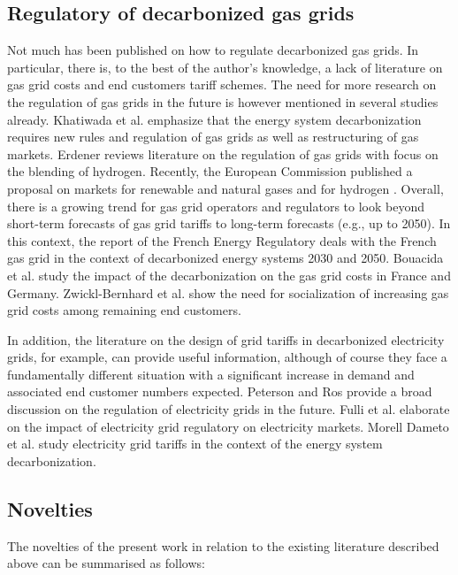 \subsection{Regulatory of decarbonized gas grids}\label{tariffs}
Not much has been published on how to regulate decarbonized gas grids. In particular, there is, to the best of the author's knowledge, a lack of literature on gas grid costs and end customers tariff schemes. The need for more research on the regulation of gas grids in the future is however mentioned in several studies already. Khatiwada et al. \cite{khatiwada2022decarbonization} emphasize that the energy system decarbonization requires new rules and regulation of gas grids as well as restructuring of gas markets. Erdener \cite{erdener2023review} reviews literature on the regulation of gas grids with focus on the blending of hydrogen. Recently, the European Commission published a proposal on markets for renewable and natural gases and for hydrogen \cite{propsal_gas_market}. Overall, there is a growing trend for gas grid operators and regulators to look beyond short-term forecasts of gas grid tariffs to long-term forecasts (e.g., up to 2050). In this context, the report of the French Energy Regulatory \cite{french} deals with the French gas grid in the context of decarbonized energy systems 2030 and 2050. Bouacida et al. \cite{bouacida2022impacts} study the impact of the decarbonization on the gas grid costs in France and Germany. Zwickl-Bernhard et al. \cite{zwickl2023design} show the need for socialization of increasing gas grid costs among remaining end customers.\vspace{0.3cm}

In addition, the literature on the design of grid tariffs in decarbonized electricity grids, for example, can provide useful information, although of course they face a fundamentally different situation with a significant increase in demand and associated end customer numbers expected. Peterson and Ros \cite{peterson2018future} provide a broad discussion on the regulation of electricity grids in the future. Fulli et al. \cite{fulli2019change} elaborate on the impact of electricity grid regulatory on electricity markets. Morell Dameto et al. \cite{morell2020revisiting} study electricity grid tariffs in the context of the energy system decarbonization. 

\subsection{Novelties}\label{novelties}
The novelties of the present work in relation to the existing literature described above can be summarised as follows: 

